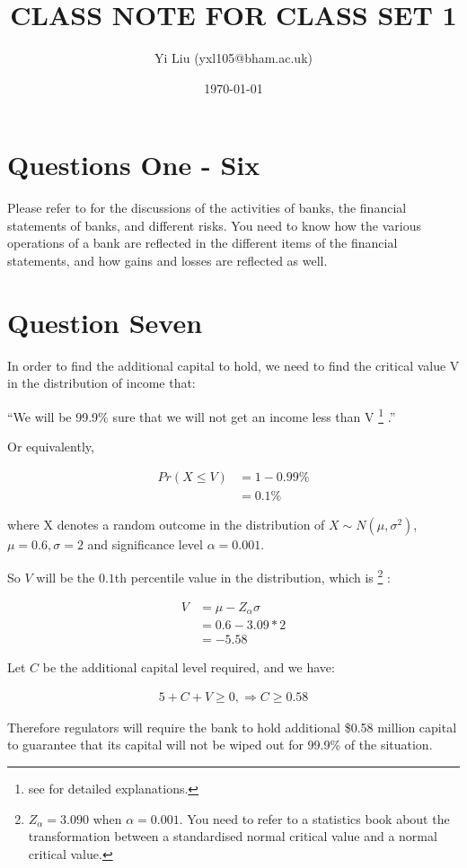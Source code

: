 \documentclass[12pt]{article}
\author{Yi Liu (yxl105@bham.ac.uk)}
\date{\today}
\title{CLASS NOTE FOR CLASS SET 1}
\begin{document}
\maketitle

\section{Questions One - Six}

Please refer to \citet[Chap.2]{hull2012risk} for the discussions of the activities of banks, the financial statements of banks, and different risks.
You need to know how the various operations of a bank are reflected in the different items of the financial statements, and how gains and losses are reflected as well.

\section{Question Seven}

In order to find the additional capital to hold, we need to find the critical value V in the distribution of income that:

``We will be 99.9\% sure that we will not get an income less than V%
\footnote{
  see \citet[Chap.9, pp.183-185]{hull2012risk} for detailed explanations.}%
.''

Or equivalently,

\begin{align*}
  Pr(X \leq V) & = 1-0.99\% \\
               & = 0.1\%
\end{align*}

where X denotes a random outcome in the distribution of
$ X \sim N(\mu, \sigma^2) $, $ \mu = 0.6, \sigma = 2 $
and significance level $ \alpha = 0.001 $.

So $ V $ will be the $ 0.1 $th percentile value in the distribution, which is%
\footnote{
  $ Z_{\alpha} = 3.090 $  when  $ \alpha = 0.001 $.
  You need to refer to a statistics book about the transformation between a standardised normal critical value and a normal critical value.
}%
:

\begin{align*}
  V & = \mu - Z_{\alpha}\sigma \\
    & = 0.6 - 3.09*2 \\
    & = -5.58
\end{align*}

Let $ C $ be the additional capital level required, and we have:

\begin{align*}
  5 + C + V \geq 0, \Rightarrow C \geq 0.58
\end{align*}

Therefore regulators will require the bank to hold additional \$0.58 million capital to guarantee that its capital will not be wiped out for 99.9\% of the situation.



\end{document}
